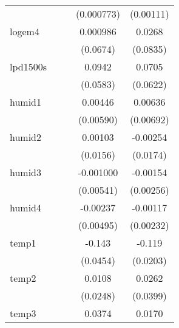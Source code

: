 {\begin{tabular}{l*{4}{c}}
            &                     &                     &  (0.000773)         &   (0.00111)         \\
[1em]
logem4      &                     &                     &    0.000986         &      0.0268         \\
            &                     &                     &    (0.0674)         &    (0.0835)         \\
[1em]
lpd1500s    &                     &                     &      0.0942         &      0.0705         \\
            &                     &                     &    (0.0583)         &    (0.0622)         \\
[1em]
humid1      &                     &                     &     0.00446         &     0.00636         \\
            &                     &                     &   (0.00590)         &   (0.00692)         \\
[1em]
humid2      &                     &                     &     0.00103         &    -0.00254         \\
            &                     &                     &    (0.0156)         &    (0.0174)         \\
[1em]
humid3      &                     &                     &   -0.001000         &    -0.00154         \\
            &                     &                     &   (0.00541)         &   (0.00256)         \\
[1em]
humid4      &                     &                     &    -0.00237         &    -0.00117         \\
            &                     &                     &   (0.00495)         &   (0.00232)         \\
[1em]
temp1       &                     &                     &      -0.143\sym{**} &      -0.119\sym{***}\\
            &                     &                     &    (0.0454)         &    (0.0203)         \\
[1em]
temp2       &                     &                     &      0.0108         &      0.0262         \\
            &                     &                     &    (0.0248)         &    (0.0399)         \\
[1em]
temp3       &                     &                     &      0.0374         &      0.0170         \\

\end{tabular}}
